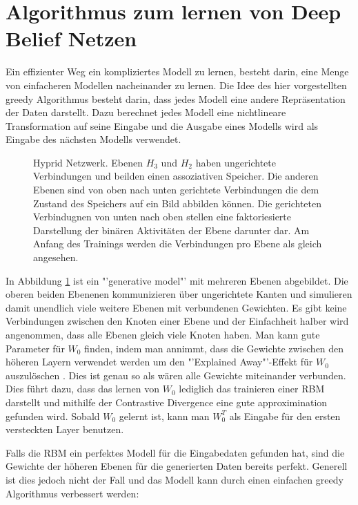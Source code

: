 \documentclass[12pt]{article}
\begin{document}
\section{Algorithmus zum lernen von Deep Belief Netzen}
Ein effizienter Weg ein kompliziertes Modell zu lernen, besteht darin, eine Menge von einfacheren Modellen nacheinander zu lernen. Die Idee des hier vorgestellten greedy Algorithmus besteht darin, dass jedes Modell eine andere Repräsentation der Daten darstellt. Dazu berechnet jedes Modell eine nichtlineare Transformation auf seine Eingabe und die Ausgabe eines Modells wird als Eingabe des nächsten Modells verwendet. 

\begin{figure}[H]
	\center
	
	\caption{Hyprid Netzwerk. Ebenen $H_3$ und $H_2$ haben ungerichtete Verbindungen und beilden einen assoziativen Speicher. Die anderen Ebenen sind von oben nach unten gerichtete Verbindungen die dem Zustand des Speichers auf ein Bild abbilden können. Die gerichteten Verbindugnen von unten nach oben stellen eine faktoriesierte Darstellung der binären Aktivitäten der Ebene darunter dar. Am Anfang des Trainings werden die Verbindungen pro Ebene als gleich angesehen.}
	\label{Netz}
\end{figure}

In Abbildung \ref{Netz} ist ein "'generative model"'  mit mehreren Ebenen abgebildet. Die oberen beiden Ebenenen kommunizieren über ungerichtete Kanten und simulieren damit unendlich viele weitere Ebenen mit verbundenen Gewichten. Es gibt keine Verbindungen zwischen den Knoten einer Ebene und der Einfachheit halber wird angenommen, dass alle Ebenen gleich viele Knoten haben. Man kann gute Parameter für $W_0$ finden, indem man annimmt, dass die Gewichte zwischen den höheren Layern verwendet werden um den "'Explained Away"'-Effekt für $W_0$ auszulöschen \cite{learning}. Dies ist genau so als wären alle Gewichte miteinander verbunden. Dies führt dazu, dass das lernen von $W_0$ lediglich das trainieren einer RBM darstellt und mithilfe der Contrastive Divergence eine gute approximination gefunden wird. Sobald $W_0$ gelernt ist, kann man $W^T_0$ als Eingabe für den ersten versteckten Layer benutzen.

Falls die RBM ein perfektes Modell für die Eingabedaten gefunden hat, sind die Gewichte der höheren Ebenen für die generierten Daten bereits perfekt. Generell ist dies jedoch nicht der Fall und das Modell kann durch einen einfachen greedy Algorithmus verbessert werden:
\end{document}
